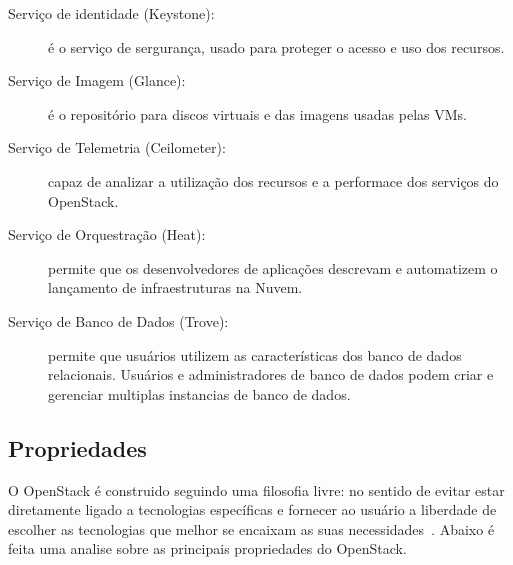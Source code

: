 \begin{description}

	\item[Serviço de identidade (Keystone):] é o serviço de sergurança, usado para proteger o acesso e uso dos recursos.

	\item[Serviço de Imagem (Glance):] é o repositório para discos virtuais e das imagens usadas pelas VMs.

	\item[Serviço de Telemetria (Ceilometer):] capaz de analizar a utilização dos recursos e a performace dos serviços do OpenStack.

	\item[Serviço de Orquestração (Heat):] permite que os desenvolvedores de aplicações descrevam e automatizem o lançamento de infraestruturas na Nuvem.

	\item[Serviço de Banco de Dados (Trove):] permite que usuários utilizem as características dos banco de dados relacionais. Usuários e administradores de banco de dados podem criar e gerenciar multiplas instancias de banco de dados.

\end{description}

\subsection{Propriedades}

O OpenStack é construido seguindo uma filosofia livre: no sentido de evitar estar diretamente ligado a tecnologias específicas e fornecer ao usuário a liberdade de escolher as tecnologias que melhor se encaixam as suas necessidades~\cite{OpenStack:Online}. Abaixo é feita uma analise sobre as principais propriedades do OpenStack.


